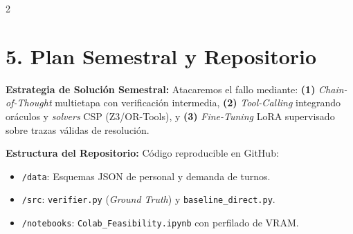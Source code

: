 \documentclass[9.5pt,a4paper]{extarticle}
\begin{document}
\begin{multicols}{2}
\section{5. Plan Semestral y Repositorio}
\textbf{Estrategia de Solución Semestral:} Atacaremos el fallo mediante:
\textbf{(1)} \textit{Chain-of-Thought} multietapa con verificación intermedia, \textbf{(2)} \textit{Tool-Calling} integrando oráculos y \textit{solvers} CSP (Z3/OR-Tools), y \textbf{(3)} \textit{Fine-Tuning} LoRA supervisado sobre trazas válidas de resolución.

\textbf{Estructura del Repositorio:} Código reproducible en GitHub:
\begin{itemize}[label=$\blacktriangleright$]
    \item \texttt{/data}: Esquemas JSON de personal y demanda de turnos.
    \item \texttt{/src}: \texttt{verifier.py} (\textit{Ground Truth}) y \texttt{baseline\_direct.py}.
    \item \texttt{/notebooks}: \texttt{Colab\_Feasibility.ipynb} con perfilado de VRAM.
\end{itemize}

\end{multicols}
\end{document}
